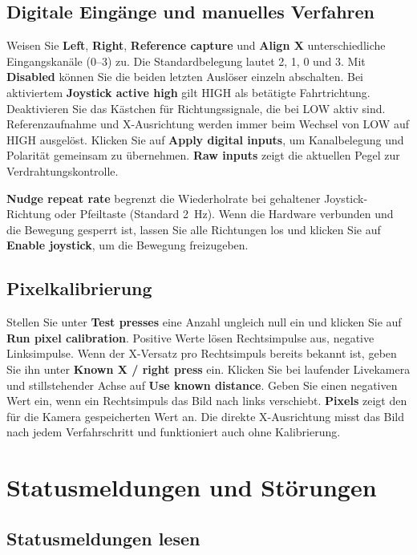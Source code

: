 \documentclass[a4paper,11pt]{article}
\begin{document}
\newpage
\subsection{Digitale Eingänge und manuelles Verfahren}

Weisen Sie \textbf{Left}, \textbf{Right}, \textbf{Reference capture} und
\textbf{Align X} unterschiedliche Eingangskanäle (0--3) zu. Die Standardbelegung
lautet 2, 1, 0 und 3. Mit \textbf{Disabled} können Sie die beiden letzten
Auslöser einzeln abschalten. Bei aktiviertem \textbf{Joystick active high}
gilt HIGH als betätigte Fahrtrichtung. Deaktivieren Sie das Kästchen für
Richtungssignale, die bei LOW aktiv sind. Referenzaufnahme und X-Ausrichtung
werden immer beim Wechsel von LOW auf HIGH ausgelöst. Klicken Sie auf
\textbf{Apply digital inputs}, um Kanalbelegung und Polarität gemeinsam zu
übernehmen. \textbf{Raw inputs} zeigt die aktuellen Pegel zur Verdrahtungskontrolle.

\textbf{Nudge repeat rate} begrenzt die Wiederholrate bei gehaltener
Joystick-Richtung oder Pfeiltaste (Standard 2~Hz). Wenn die Hardware verbunden
und die Bewegung gesperrt ist, lassen Sie alle Richtungen los und klicken Sie
auf \textbf{Enable joystick}, um die Bewegung freizugeben.

\subsection{Pixelkalibrierung}

Stellen Sie unter \textbf{Test presses} eine Anzahl ungleich null ein und klicken
Sie auf \textbf{Run pixel calibration}. Positive Werte lösen
Rechtsimpulse aus, negative Linksimpulse. Wenn der X-Versatz pro Rechtsimpuls
bereits bekannt ist, geben Sie ihn unter \textbf{Known X / right press} ein.
Klicken Sie bei laufender Livekamera und stillstehender Achse auf
\textbf{Use known distance}. Geben Sie einen negativen Wert ein, wenn ein
Rechtsimpuls das Bild nach links verschiebt. \textbf{Pixels} zeigt den für die
Kamera gespeicherten Wert an. Die direkte X-Ausrichtung misst das Bild nach
jedem Verfahrschritt und funktioniert auch ohne Kalibrierung.

\newpage
\section{Statusmeldungen und Störungen}

\subsection{Statusmeldungen lesen}
\end{document}
